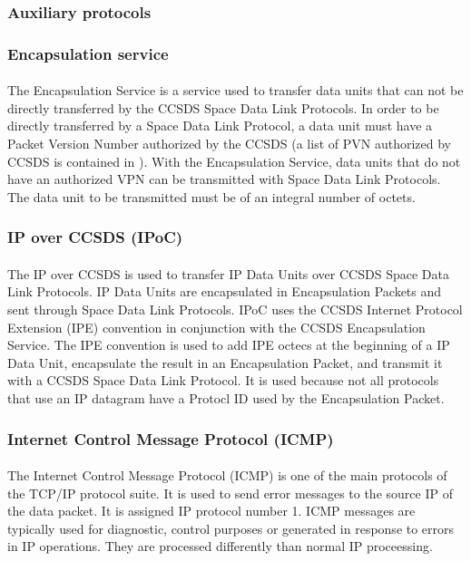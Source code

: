 \subsubsection{Auxiliary protocols}

\subsubsection{Encapsulation service\cite{ES}}
\paragraph{}The Encapsulation Service is a service used to transfer data units that can not be directly transferred by the CCSDS Space Data Link Protocols. In order to be directly transferred by a Space Data Link Protocol, a data unit must have a Packet Version Number authorized by the CCSDS (a list of PVN authorized by CCSDS is contained in \cite{SANAPVN}). With the Encapsulation Service, data units that do not have an authorized VPN can be transmitted with Space Data Link Protocols. The data unit to be transmitted must be of an integral number of octets.
\subsubsection*{IP over CCSDS (IPoC)\cite{IPoC}}
\paragraph{}The IP over CCSDS is used to transfer IP Data Units over CCSDS Space Data Link Protocols. IP Data Units are encapsulated in Encapsulation Packets and sent through Space Data Link Protocols. IPoC uses the CCSDS Internet Protocol
Extension (IPE) convention in conjunction with the CCSDS Encapsulation Service. The IPE convention is used to add IPE octecs at the beginning of a IP Data Unit, encapsulate the result in an Encapsulation Packet, and transmit it with a CCSDS Space Data Link Protocol. It is used because not all protocols that use an IP datagram have a Protocl ID used by the Encapsulation Packet.
\subsubsection*{Internet Control Message Protocol (ICMP)\cite{ICMP}}
\paragraph{}The Internet Control Message Protocol (ICMP) is one of the main protocols of the TCP/IP protocol suite. It is used to send error messages to the source IP of the data packet. It is assigned IP protocol number 1. ICMP messages are typically used for diagnostic, control purposes or generated in response to errors in IP operations. They are processed differently than normal IP proceessing.
